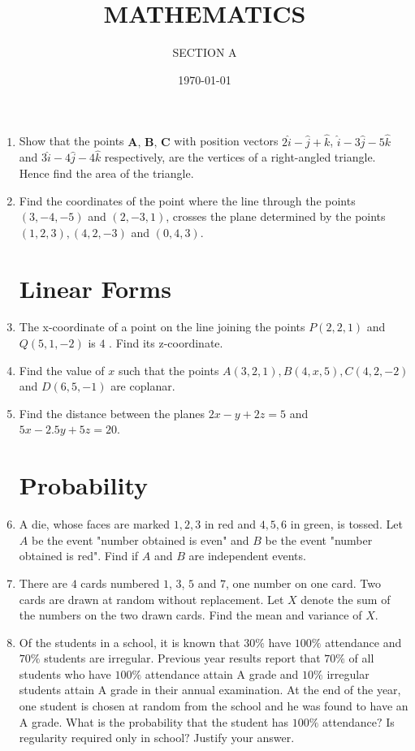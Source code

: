 \documentclass{article}
\title{\textbf{MATHEMATICS}}
\author{SECTION A}
\date{\today}
\providecommand{\brak}[1]{\ensuremath{\left(#1\right)}}
\begin{document}
\maketitle
\begin{enumerate}
\section{Vectors}
\item Show that the points $\textbf{A, B, C}$ with position vectors $2 \hat{i}-\hat{j}+\hat{k}$, $\hat{i}-3 \hat{j}-5 \hat{k}$ and $3 \hat{i}-4 \hat{j}-4 \hat{k}$ respectively, are the vertices of a right-angled triangle. Hence find the area of the triangle.
\item Find the coordinates of the point where the line through the points $\brak{3,-4,-5}$ and $\brak{2,-3,1}$, crosses the plane determined by the points $\brak{1,2,3},\brak{4,2,-3}$ and $\brak{0,4,3}$.
\section{Linear Forms}
\item The x-coordinate of a point on the line joining the points $P\brak{2,2,1}$ and $Q\brak{5,1,-2}$ is $4$ . Find its z-coordinate.
\item Find the value of $x$ such that the points $A\brak{3,2,1}, B\brak{4, x, 5}, C\brak{4,2,-2}$ and $D\brak{6,5,-1}$ are coplanar.
\item Find the distance between the planes $2x-y+2z=5$ and $5x-2.5y+5z=20$.
\section{Probability}
\item A die, whose faces are marked $1,2,3$ in red and $4, 5, 6$ in green, is tossed. Let $A$ be the event "number obtained is even" and $B$ be the event "number obtained is red". Find if $A$ and $B$ are independent events.
\item There are $4$ cards numbered $1$, $3$, $5$ and $7$, one number on one card. Two cards are drawn at random without replacement. Let $X$ denote the sum of the numbers on the two drawn cards. Find the mean and variance of $X$.
\item Of the students in a school, it is known that $30 \%$ have $100\%$ attendance and $70 \%$ students are irregular. Previous year results report that $70 \%$ of all students who have $100 \%$ attendance attain A grade and $10\%$ irregular students attain A grade in their annual examination. At the end of the year, one student is chosen at random from the school and he was found to have an A grade. What is the probability that the student has $100 \%$ attendance$?$ Is regularity required only in school$?$ Justify your answer.

\end{enumerate}
\end{document}
